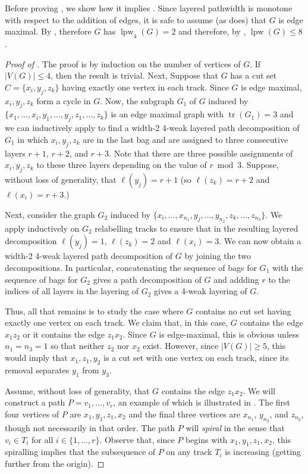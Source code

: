\documentclass{patmorin}
\DeclareMathOperator{\tr}{tr}
\DeclareMathOperator{\lpw}{lpw}
\begin{document}
Before proving , we show how it implies .
Since layered pathwidth is monotone with respect to the addition of edges,
it is safe to assume (as  does) that $G$ is edge maximal.
By , therefore $G$ has $\lpw_4(G)=2$ and therefore, by
, $\lpw(G)\le 8$.

\begin{proof}[Proof of ]
  The proof is by induction on the number of vertices of $G$.  If
  $|V(G)|\le 4$, then the result is trivial.  Next, Suppose that $G$ has
  a cut set $C=\{x_i,y_j,z_k\}$ having exactly one vertex in each track.
  Since $G$ is edge maximal, $x_i,y_j,z_k$ form a cycle in $G$.  Now,
  the subgraph $G_1$ of $G$ induced by $\{x_1,\ldots,x_i, y_1,\ldots,y_j,
  z_1,\ldots,z_k\}$ is an edge maximal graph with $\tr(G_1)=3$ and we
  can inductively apply  to find a width-2 4-weak layered
  path decomposition of $G_1$ in which $x_i,y_j,z_k$ are in the last bag
  and are assigned to three consecutive layers $r+1$, $r+2$, and $r+3$.
  Note that there are three possible assignments of $x_i,y_j,z_k$ to
  these three layers depending on the value of $r\bmod 3$.  Suppose,
  without loss of generality, that $\ell(y_j)=r+1$ (so $\ell(z_k)=r+2$
  and $\ell(x_i)=r+3$.)

  Next, consider the graph $G_2$ induced by
  $\{x_i,\ldots,x_{n_1},y_j,\ldots,y_{n_2},z_k,\ldots,z_{n_3}\}$.
  We apply  inductively on $G_2$ relabelling tracks to
  ensure that in the resulting layered decomposition $\ell(y_j)=1$,
  $\ell(z_k)=2$ and $\ell(x_i)=3$.   We can now obtain a width-2 4-weak
  layered path decomposition of $G$ by joining the two decompositions.
  In particular,  concatenating the sequence of bags for $G_1$ with
  the sequence of bags for $G_2$ gives a path decomposition of $G$
  and addding $r$ to the indices of all layers in the layering of $G_2$
  gives a 4-weak layering of $G$.

  Thus, all that remains is to study the case where $G$ contains no cut
  set having exactly one vertex on each track.  We claim that, in this
  case, $G$ contains the edge $x_1z_2$ or it contains the edge $z_1x_2$.
  Since $G$ is edge-maximal, this is obvious unless $n_1=n_3=1$ so
  that neither $z_2$ nor $x_2$ exist.  However, since $|V(G)|\ge 5$,
  this would imply that $x_1,z_1,y_2$ is a cut set with one vertex on
  each track, since its removal separates $y_1$ from $y_3$.

  Assume, without loss of generality, that $G$ contains the edge $z_1x_2$.
  We will construct a path $P=v_1,\ldots,v_r$, an example of which is illustrated in .
  The first four vertices of $P$ are 
  $x_1,y_1,z_1,x_2$ and the final three vertices are $x_{n_1}$,
  $y_{n_2}$, and $z_{n_3}$, though not necessarily in that order.
  The path $P$ will \emph{spiral} in the sense that $v_i\in T_i$
  for all $i\in\{1,\ldots,r\}$.  Observe that, since $P$ begins with
  $x_1,y_1,z_1,x_2$, this spiralling implies that the subsequence of $P$ on any
  track $T_i$ is increasing (getting further from the origin).


\end{proof}
\end{document}
